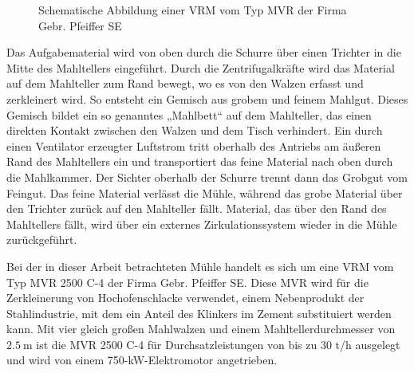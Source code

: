 %
\begin{figure}[hbt!]
    \centering
    \hspace*{-4cm}
    
    \caption{Schematische Abbildung einer \ac{VRM} vom Typ MVR der Firma Gebr. Pfeiffer SE}
    \label{fig:muehle}
\end{figure}
%
Das Aufgabematerial wird von oben durch die Schurre über einen Trichter in die Mitte des Mahltellers eingeführt. Durch die Zentrifugalkräfte wird das Material auf dem Mahlteller zum Rand bewegt, wo es von den Walzen erfasst und zerkleinert wird. So entsteht ein Gemisch aus grobem und feinem Mahlgut. Dieses Gemisch bildet ein so genanntes „Mahlbett“ auf dem Mahlteller, das einen direkten Kontakt zwischen den Walzen und dem Tisch verhindert.
Ein durch einen Ventilator erzeugter Luftstrom tritt oberhalb des Antriebs am äußeren Rand des Mahltellers ein und transportiert das feine Material nach oben durch die Mahlkammer. Der Sichter oberhalb der Schurre trennt dann das Grobgut vom Feingut. Das feine Material verlässt die Mühle, während das grobe Material über den Trichter zurück auf den Mahlteller fällt. Material, das über den Rand des Mahltellers fällt, wird über ein externes Zirkulationssystem wieder in die Mühle zurückgeführt. \par
Bei der in dieser Arbeit betrachteten Mühle handelt es sich um eine \ac{VRM} vom Typ MVR 2500 C-4 der Firma Gebr. Pfeiffer SE. Diese MVR wird für die Zerkleinerung von Hochofenschlacke verwendet, einem Nebenprodukt der Stahlindustrie, mit dem ein Anteil des Klinkers im Zement substituiert werden kann. Mit vier gleich großen Mahlwalzen und einem Mahltellerdurchmesser von $\SI{2,5}{\meter}$ ist die MVR 2500 C-4 für Durchsatzleistungen von bis zu 30 t/h ausgelegt und wird von einem 750-kW-Elektromotor angetrieben. 
%
